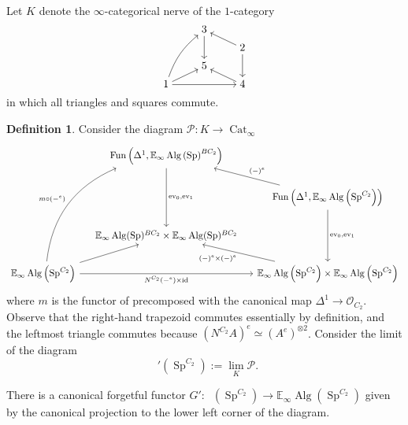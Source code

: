\documentclass{article}
\DeclareMathOperator{\Alg}{Alg}
\DeclareMathOperator{\CAlgp}{CAlg^p} %
\DeclareMathOperator{\Cat}{Cat} %
\DeclareMathOperator{\Fun}{Fun} %
\DeclareMathOperator{\id}{id} %
\DeclareMathOperator{\Spectra}{Sp} %
\newcommand{\EE}{\mathbb{E}}
\theoremstyle{definition}
\newtheorem{definition}[equation]{Definition}
\begin{document}
Let $ K $ denote the $ \infty $-categorical nerve of the $ 1 $-category
\begin{equation*}%
\begin{tikzcd}[cramped, row sep=tiny]
    & 3 \ar[dd] & \\
    & & 2 \ar[dd] \ar[lu] \\
    & 5 & \\
    1  \ar[rr] \ar[ru] \ar[ruuu, bend left=15] & & 4 \ar[lu]
\end{tikzcd}
\end{equation*}
in which all triangles and squares commute. 

\begin{definition}\label{defn:calgp_alt_diagram}
    Consider the diagram $ \mathcal{P} \colon K \to \Cat_\infty $ 
    \begin{equation}%
    \begin{tikzcd}[column sep=small]
        & \Fun\left(\Delta^1,\EE_\infty\Alg\left(\Spectra\right)^{BC_2}\right) \ar[dd,"{\mathrm{ev}_{0},\mathrm{ev}_{1}}"]  & \\
        & & \Fun\left(\Delta^1,\EE_\infty\Alg\left(\Spectra^{C_2}\right)\right) \ar[dd,"{\mathrm{ev}_{0}, \mathrm{ev}_{1}}"] \ar[lu,"{(-)^e}"'] \\
        &\EE_\infty\Alg(\Spectra)^{BC_2} \times \EE_\infty\Alg(\Spectra)^{BC_2} & \\
        \EE_\infty\Alg\left(\Spectra^{C_2}\right)  \ar[rr,"{N^{C_2}(-^e) \times \id}"'] \ar[ru] \ar[ruuu,"{m \circ (-^e)}", bend left=30] & &\EE_\infty\Alg\left(\Spectra^{C_2}\right) \times \EE_\infty\Alg\left(\Spectra^{C_2}\right) \ar[lu,"{(-)^e \times (-)^e}"]
    \end{tikzcd}
    \end{equation}
    where $ m $ is the functor of \cite[Construction 3.1]{LYang_normedrings} precomposed with the canonical map $ \Delta^1 \to \mathcal{O}_{C_2} $. 
    Observe that the right-hand trapezoid commutes essentially by definition, and the leftmost triangle commutes because $ \left(N^{C_2} A \right)^e \simeq (A^e)^{\otimes 2} $. 
    Consider the limit of the diagram 
    \begin{equation}
        \CAlgp'\left(\Spectra^{C_2}\right) := \lim_K \mathcal{P} .
    \end{equation} 

    There is a canonical forgetful functor $ G' \colon \CAlgp\left(\Spectra^{C_2}\right) \to \EE_\infty\Alg\left(\Spectra^{C_2}\right)  $ given by the canonical projection to the lower left corner of the diagram. 
\end{definition}
\end{document}
